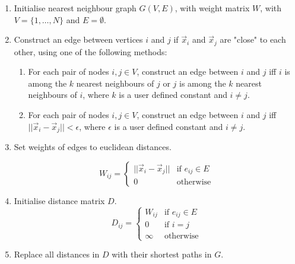 \documentclass[a4paper, 11pt]{article}
\begin{document}
\begin{enumerate}

\item Initialise nearest neighbour graph $G(V,E)$, with weight matrix $W$, with $V = \{1, \dots , N\}$ and $E = \emptyset$. 

\item Construct an edge between vertices $i$ and $j$ if $\vec{x}_i$ and $\vec{x}_j$ are "close" to each other, using one of the following methods: 

	\begin{multicols}{2}
	\begin{enumerate}
	\item 
	For each pair of nodes $i,j \in V$,  construct an 		edge between $i$ and $j$ iff $i$ is among the $k$ nearest 		neighbours of $j$ or $j$ is among the $k$ nearest 				neighbours of $i$, where $k$ is a user defined constant and $i \neq j$.  

	\columnbreak
	\item 
	For each pair of nodes $i,j \in V$,  construct an 		edge between $i$ and $j$ iff $||\vec{x}_i - \vec{x}_j|| < 	\epsilon$, where $\epsilon$ is a user defined constant and $i \neq j$.  

	\end{enumerate}
	\end{multicols}

\item Set weights of edges to euclidean distances.

	\begin{equation}
	W_{ij} = 
	\begin{cases}
	||\vec{x}_i - \vec{x}_j|| & \text{if } e_{ij} \in E \\
	0 & \text{otherwise}
	
	\end{cases}
	\end{equation}


	\item Initialise distance matrix $D$.
	\begin{equation}
	D_{ij} = 
	\begin{cases}
	W_{ij} & \text{if } e_{ij} \in E \\
	0 & \text{if } i = j	\\
	\infty & \text{otherwise}	
	\end{cases}
	\end{equation}

	\item Replace all distances in $D$ with their shortest 			paths in $G$.
	

\end{enumerate}
\end{document}
